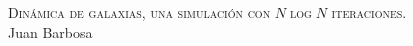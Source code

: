 \documentclass{beamer}
\begin{document}
{
	\begin{frame}
		\centering
		\color{white}
		\textsc{\LARGE Dinámica de galaxias, una simulación con $N\log N$ iteraciones.}
		\\
		\vspace{5cm}
		\raggedleft Juan Barbosa
	\end{frame}
}
\end{document}
